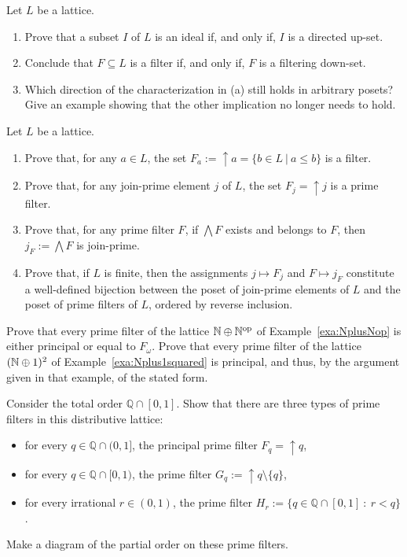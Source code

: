 \begin{exercise}\label{exe:idealdirected}
  Let $L$ be a lattice.
  \begin{enumerate}
  \item Prove that a subset $I$ of $L$ is an ideal if, and only if, $I$ is a directed up-set.
  \item Conclude that $F \subseteq L$ is a filter if, and only if, $F$ is a filtering down-set.
  \item Which direction of the characterization in (a) still holds in arbitrary posets? Give an example showing that the other implication no longer needs to hold.
    \end{enumerate}
\end{exercise}
\begin{exercise}\label{exe:joinprime-primefilt}
Let $L$ be a lattice.
\begin{enumerate}
\item Prove that, for any $a \in L$, the set $F_a := {\uparrow}a = \{b \in L \ | \ a \leq b\}$ is a filter.
\item Prove that, for any join-prime element $j$ of $L$, the set $F_j = {\uparrow}j$ is a prime filter.
\item Prove that, for any prime filter $F$, if $\bigwedge F$ exists and belongs to $F$, then $j_F := \bigwedge F$ is join-prime.
\item Prove that, if $L$ is finite, then the assignments $j \mapsto F_j$ and $F \mapsto j_F$ constitute a well-defined bijection between the poset of join-prime elements of $L$ and the poset of prime filters of $L$, ordered by reverse inclusion.
\end{enumerate}
\end{exercise}

\exercise 
  Prove that every prime filter of the lattice $\mathbb{N} \oplus \mathbb{N}^{\mathrm{op}}$ of Example~\ref{exa:NplusNop} is either principal or equal to $F_\omega$.
\exercise
  Prove that every prime filter of the lattice $(\mathbb{N} \oplus 1)^2$ of Example~\ref{exa:Nplus1squared} is principal, and thus, by the argument given in that example, of the stated form.

  \begin{exercise}\label{exe:rationalunitinterval}
    Consider the total order $\mathbb{Q} \cap [0,1]$. Show that there are three types of prime filters in this distributive lattice: 
    \begin{itemize}
      \item for every $q \in \mathbb{Q} \cap (0,1]$, the principal prime filter $F_q = {\uparrow} q$,
      \item for every $q \in \mathbb{Q} \cap [0,1)$, the prime filter $G_q := {\uparrow} q \setminus \{q\}$,  
      \item for every irrational $r \in (0,1)$, the prime filter $H_r := \{ q \in \mathbb{Q} \cap [0,1] \ \colon \ r < q \}$. 
    \end{itemize}
    Make a diagram of the partial order on these prime filters.
    \end{exercise}

